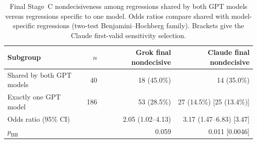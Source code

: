 \begin{table}[t]
\centering
\caption{Final Stage~C nondecisiveness among regressions shared by both GPT models versus regressions specific to one model. Odds ratios compare shared with model-specific regressions (two-test Benjamini--Hochberg family). Brackets give the Claude first-valid sensitivity selection.}
\label{tab:shared}
\small
\begin{tabular}{lrrr}
\toprule
Subgroup & $n$ & Grok final nondecisive & Claude final nondecisive \\
\midrule
Shared by both GPT models & 40 & 18 (45.0\%) & 14 (35.0\%) \\
Exactly one GPT model & 186 & 53 (28.5\%) & 27 (14.5\%) [25 (13.4\%)] \\
\midrule
Odds ratio (95\% CI) & & 2.05 (1.02--4.13) & 3.17 (1.47--6.83) [3.47] \\
$p_{\mathrm{BH}}$ & & 0.059 & 0.011 [0.0046] \\
\bottomrule
\end{tabular}
\end{table}

